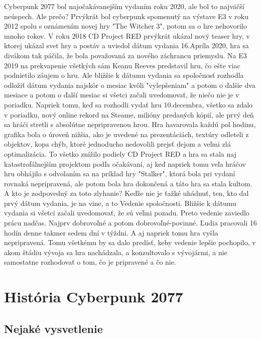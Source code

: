 \documentclass[10pt,twoside,slovak,a4paper]{article}
\begin{document}
Cyberpunk 2077 bol najočakávanejším vydaním roku 2020, ale bol to najväčší neúspech. Ale prečo? Prvýkrát bol cyberpunk spomenutý na výstave E3 v roku 2012 spolu s oznámením novej hry "The Witcher 3", potom sa o hre nehovorilo mnoho rokov. V roku 2018 CD Project RED prvýkrát ukázal nový teaser hry, v ktorej ukázal svet hry a postáv a uviedol dátum vydania 16.Apríla 2020, hra sa divákom tak páčila, že bola považovaná za nového záchrancu priemyslu. Na E3 2019 na prekvapenie všetkých sám Keanu Reeves predstavil hru, čo ešte viac podnietilo záujem o hru. Ale bližšie k dátumu vydania sa spoločnosť rozhodla odložiť dátum vydania najskôr o mesiac kvôli "vylepšeniam" a potom o ďalšie dva mesiace a potom o ďalší mesiac si všetci začali uvedomovať, že niečo nie je v poriadku. Napriek tomu, keď sa rozhodli vydať hru 10.decembra, všetko sa zdalo v poriadku, nový online rekord na Steame, milióny predaných kópií, ale prvý deň sa hráči stretli s absolútne nepripravenou hrou. Hra havarovala každú pol hodinu, grafika bola o úroveň nižšia, ako je uvedené na prezentáciách, textúry odleteli z objektov, kopa chýb, ktoré jednoducho nedovolili prejsť dejom a veľmi zlá optimalizácia. To všetko znížilo podiely CD Project RED a hra sa stala naj katastrofálnejším projektom podľa očakávaní, aj keď napriek tomu veľa hráčov hru obhájilo s odvolaním sa na príklad hry "Stalker", ktorá bola pri vydaní rovnaká nepripravená, ale potom bola hra dokončená a táto hra sa stala kultom.
A kto je zodpovedný za toto zlyhanie? Keďže nie je ťažké uhádnuť, ten, kto dal prvý dátum vydania, je na vine, a to Vedenie spoločnosti. Bližšie k dátumu vydania si všetci začali uvedomovať, že sú veľmi pozadu. Preto vedenie zaviedlo prácu nadčas. Najprv dobrovoľné a potom dobrovoľné-povinné. Ľudia pracovali 16 hodín denne takmer sedem dní v týždni. A aj napriek tomu hra vyšla nepripravená.  Tomu všetkému by sa dalo predísť, keby vedenie lepšie pochopilo, v akom štádiu vývoja sa hra nachádzala, a konzultovalo s vývojármi, a nie samostatne rozhodovať o tom, čo je pripravené a čo nie.



\section{História Cyberpunk 2077} \label{historia}




\subsection{Nejaké vysvetlenie} \label{ina:nejake}
\end{document}
